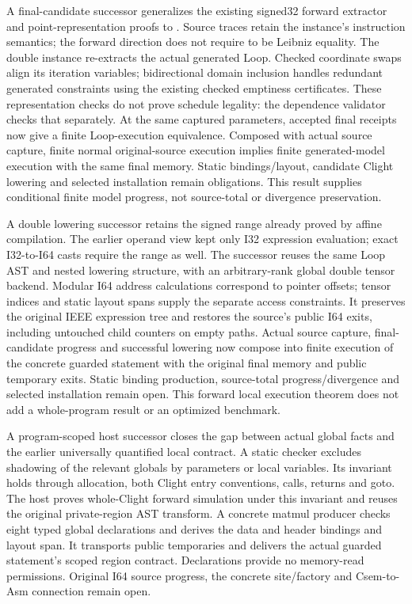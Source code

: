 A final-candidate successor generalizes the existing signed32 forward extractor
and point-representation proofs to . Source traces retain the
instance's instruction semantics; the forward direction does not require
 to be Leibniz equality. The double instance re-extracts the
actual generated Loop. Checked coordinate swaps align its iteration variables;
bidirectional domain inclusion handles redundant generated constraints using
the existing checked emptiness certificates. These representation checks do
not prove schedule legality: the dependence validator checks that separately.
At the same captured parameters, accepted final receipts now give a finite
Loop-execution equivalence. Composed with actual source capture, finite normal
original-source execution implies finite generated-model execution with the
same final memory. Static bindings/layout, candidate Clight lowering and
selected installation remain obligations. This result supplies conditional
finite model progress, not source-total or divergence preservation.

A double lowering successor retains the signed range already proved by affine
compilation. The earlier operand view kept only I32 expression evaluation;
exact I32-to-I64 casts require the range as well. The successor reuses the same
Loop AST and nested lowering structure, with an arbitrary-rank global double
tensor backend. Modular I64 address calculations correspond to pointer offsets;
tensor indices and static layout spans supply the separate access constraints.
It preserves the original IEEE expression tree and restores the source's public
I64 exits, including untouched child counters on empty paths. Actual source
capture, final-candidate progress and successful lowering now compose into
finite execution of the concrete guarded statement with the original final
memory and public temporary exits. Static binding production, source-total
progress/divergence and selected installation remain open. This forward local
execution theorem does not add a whole-program result or an optimized benchmark.

A program-scoped host successor closes the gap between actual global facts and
the earlier universally quantified local contract. A static checker excludes
shadowing of the relevant globals by parameters or local variables. Its
invariant holds through allocation, both Clight entry conventions, calls,
returns and goto. The host proves whole-Clight forward simulation under this
invariant and reuses the original private-region AST transform. A concrete
matmul producer checks eight typed global declarations and derives the data
and header bindings and layout span. It transports public temporaries and
delivers the actual guarded statement's scoped region contract. Declarations
provide no memory-read permissions. Original I64 source progress, the concrete
site/factory and Csem-to-Asm connection remain open.


